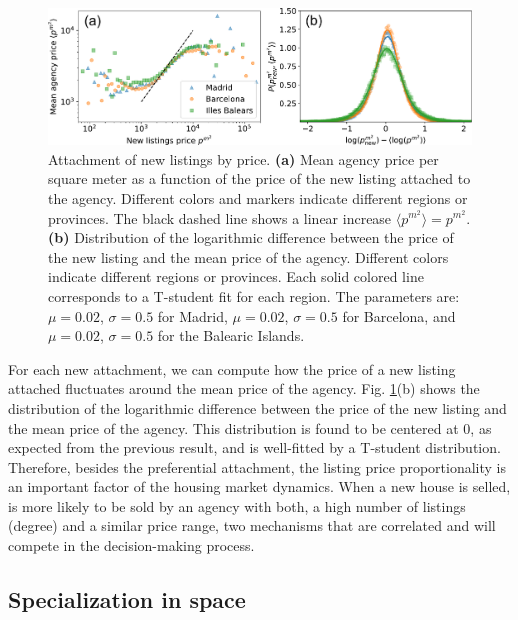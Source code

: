 \begin{figure}
    \centering
    \includegraphics[width =\textwidth]{Figs/Idealista_dynamics/panel_attach_price.pdf}
	\caption[Attachment dynamics of new listings by price.]{Attachment of new listings by price. \textbf{(a)} Mean agency price per square meter as a function of the price of the new listing attached to the agency. Different colors and markers indicate different regions or provinces. The black dashed line shows a linear increase $\langle p^{{m}^2} \rangle = p^{{m}^2}$. \textbf{(b)} Distribution of the logarithmic difference between the price of the new listing and the mean price of the agency. Different colors indicate different regions or provinces. Each solid colored line corresponds to a T-student fit for each region. The parameters are: $\mu = 0.02$, $\sigma = 0.5$ for Madrid, $\mu = 0.02$, $\sigma = 0.5$ for Barcelona, and $\mu = 0.02$, $\sigma = 0.5$ for the Balearic Islands. \label{fig:attach_price}}
\end{figure}

For each new attachment, we can compute how the price of a new listing attached fluctuates around the mean price of the agency. Fig. \ref{fig:attach_price}(b) shows the distribution of the logarithmic difference between the price of the new listing and the mean price of the agency. This distribution is found to be centered at $0$, as expected from the previous result, and is well-fitted by a T-student distribution. Therefore, besides the preferential attachment, the listing price proportionality is an important factor of the housing market dynamics. When a new house is selled, is more likely to be sold by an agency with both, a high number of listings (degree) and a similar price range, two mechanisms that are correlated and will compete in the decision-making process.

\subsection{Specialization in space}

